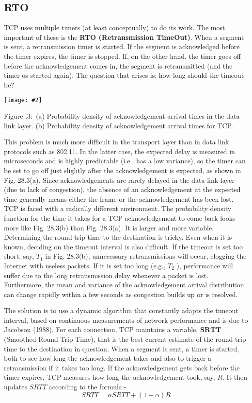 \documentclass[twoside]{article}
\newcounter{lecnum}
\newcommand{\fig}[3]{
			\vspace{#2}
			\begin{center}
			Figure \thelecnum.#1:~#3
			\end{center}
   }
\newcommand{\iph}[2]{
   \texttt{[image: \#2]}
}
\begin{document}
\subsection{RTO}

TCP uses multiple timers (at least conceptually) to do its work. The most important of these is the \textbf{RTO (Retransmission TimeOut)}. When a segment is sent, a retransmission timer is started. If the segment is acknowledged before the timer expires, the timer is stopped. If, on the other hand, the timer goes off before the acknowledgement comes in, the segment is retransmitted (and the timer os started again). The question that arises is: how long should the timeout be?

\iph{0.8}{timer}

\fig{3}{0in}{(a) Probability density of acknowledgement arrival times in the data link layer. (b) Probability density of acknowledgement arrival times for TCP.}

This problem is much more difficult in the transport layer than in data link protocols such as 802.11. In the latter case, the expected delay is measured in microseconds and is highly predictable (i.e., has a low variance), so the timer can be set to go off just slightly after the acknowledgement is expected, as shown in Fig. 28.3(a). Since acknowledgements are rarely delayed in the data link layer (due to lack of congestion), the absence of an acknowledgement at the expected time generally means either the frame or the acknowledgement has been lost. TCP is faced with a radically different environment. The probability density function for the time it takes for a TCP acknowledgement to come back looks more like Fig. 28.3(b) than Fig. 28.3(a). It is larger and more variable. Determining the round-trip time to the destination is tricky. Even when it is known, deciding on the timeout interval is also difficult. If the timeout is set too short, say, $T_1$ in Fig. 28.3(b), unnecessary retransmissions will occur, clogging the Internet with useless packets. If it is set too long (e.g., $T_2$ ), performance will suffer due to the long retransmission delay whenever a packet is lost. Furthermore, the mean and variance of the acknowledgement arrival distribution can change rapidly within a few seconds as congestion builds up or is resolved.

The solution is to use a dynamic algorithm that constantly adapts the timeout interval, based on continuous measurements of network performance and is due to Jacobson (1988). For each connection, TCP maintains a variable, $\mathbf{SRTT}$ (Smoothed Round-Trip Time), that is the best current estimate of the round-trip time to the destination in question. When a segment is sent, a timer is started, both to see how long the acknowledgement takes and also to trigger a retransmission if it takes too long. If the acknowledgement gets back before the timer expires, TCP measures how long the acknowledgement took, say, $R$. It then updates $SRTT$ according to the formula:- $$SRTT = \alpha SRTT + (1 - \alpha)R$$ 
\end{document}
